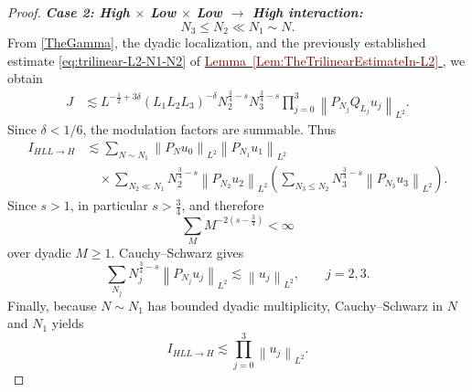 \documentclass[12pt,oneside,reqno]{amsart}
\newcommand{\lemref}[1]{%
    \hyperref[#1]{%
        \textcolor{Maroon}{Lemma~\ref*{#1}}%
    }%
}
\numberwithin{equation}{section}
\theoremstyle{plain}
\newcommand{\Lpn}[2]{%
    \left\lVert #1\right\rVert_{L^{#2}}%
}
\newcommand{\Ifr}[4]{%
    I_{{#1}{#2}{#3}\to{#4}}%
}
\begin{document}
\begin{proof}
\noindent
\textbf{\emph{Case 2: High $\times$ Low $\times$ Low $\to$ High interaction:}}
\begin{equation}
    N_3\leq N_2\ll N_1\sim N.
\end{equation}
From \eqref{TheGamma}, the dyadic localization, and the previously
established estimate
\eqref{eq:trilinear-L2-N1-N2} of
\lemref{Lem:TheTrilinearEstimateIn-L2}, we obtain
\begin{align}
J
&\lesssim
L^{-\frac12+3\delta}
(L_1L_2L_3)^{-\delta}
N_2^{\frac34-s}
N_3^{\frac34-s}
\prod_{j=0}^3
\Lpn{P_{N_j}Q_{L_j}u_j}{2}.
\label{eq:case2-dyadic}
\end{align}
Since $\delta<1/6$, the modulation factors are summable. Thus
\begin{align}
\Ifr{H}{L}{L}{H}
&\lesssim
\sum_{N\sim N_1}
\Lpn{P_Nu_0}{2}
\Lpn{P_{N_1}u_1}{2}
\nonumber\\
&\quad\times
\sum_{N_2\ll N_1}
N_2^{\frac34-s}
\Lpn{P_{N_2}u_2}{2}
\left(
    \sum_{N_3\leq N_2}
    N_3^{\frac34-s}
    \Lpn{P_{N_3}u_3}{2}
\right).
\label{eq:case2-spatial-sum}
\end{align}
Since $s>1$, in particular $s>\frac34$, and therefore
\begin{equation}
    \sum_M M^{-2(s-\frac34)}
    <\infty
\end{equation}
over dyadic $M\geq1$. Cauchy--Schwarz gives
\begin{equation}
    \sum_{N_j}
    N_j^{\frac34-s}
    \Lpn{P_{N_j}u_j}{2}
    \lesssim
    \Lpn{u_j}{2},
    \qquad
    j=2,3.
\end{equation}
Finally, because $N\sim N_1$ has bounded dyadic multiplicity,
Cauchy--Schwarz in $N$ and $N_1$ yields
\begin{equation}
\label{eq:case2-final}
    \Ifr{H}{L}{L}{H}
    \lesssim
    \prod_{j=0}^3
    \Lpn{u_j}{2}.
\end{equation}


\end{proof}
\end{document}
